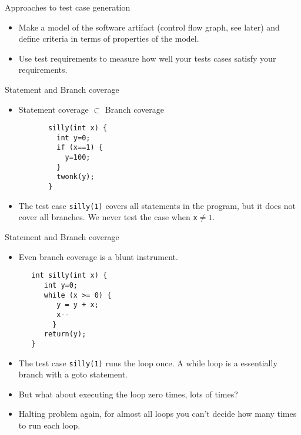 \documentclass[handout]{beamer}
\begin{document}
\begin{frame}{Approaches to test case generation}
  \begin{itemize}
  \item Make a model of the software artifact (control flow graph, see
    later) and define criteria in terms of properties of the model.
  \item Use test requirements to measure how well your tests cases
    satisfy your requirements.
  \end{itemize}
\end{frame}
\begin{frame}[fragile]{Statement and Branch coverage}

\begin{itemize}
\item Statement coverage $\subset$ Branch coverage
\begin{lstlisting}
       silly(int x) {
         int y=0;
         if (x==1) {
           y=100;
         }
         twonk(y);
       }
\end{lstlisting}

  \item  The test case {\tt silly(1)} covers all statements in the program, but
  it does not cover all branches. We never test the case when {\tt x}$\neq1$.
\end{itemize}
\end{frame}

\begin{frame}[fragile]{Statement and Branch coverage}
\begin{itemize}
 \item Even branch coverage is a blunt instrument.
\begin{lstlisting}
   int silly(int x) { 
      int y=0;
      while (x >= 0) {
         y = y + x;
         x--
        }
      return(y);
   }
\end{lstlisting}
  \item The test case {\tt silly(1)} runs the loop once. A while loop is a
    essentially branch with a goto statement. 
  \item But what about executing the loop zero times, lots of times?
   \item Halting problem again, for almost all loops you can't
     decide how many times to run each loop.
\end{itemize}
    
\end{frame}
\end{document}
